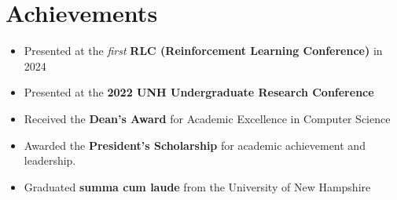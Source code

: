 \documentclass[letterpaper,11pt]{article}
\begin{document}
\section{Achievements}
\begin{itemize} %
    \item Presented at the \emph{first} \textbf{RLC (Reinforcement Learning Conference)} in 2024
    \item Presented at the \textbf{2022 UNH Undergraduate Research Conference}
    \item Received the \textbf{Dean's Award} for Academic Excellence in Computer Science
    \item Awarded the \textbf{President's Scholarship} for academic achievement and leadership.
    \item Graduated \textbf{summa cum laude} from the University of New Hampshire
\end{itemize} %
\end{document}
